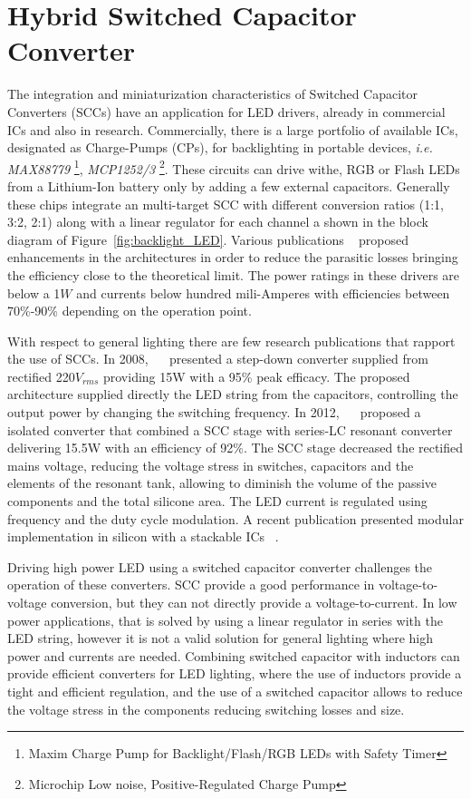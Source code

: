 \chapter{Hybrid Switched Capacitor Converter}

The integration and miniaturization characteristics of Switched Capacitor Converters (SCCs) have an application for LED drivers, already in  commercial ICs and also in research. Commercially, there is a large portfolio of available ICs, designated as Charge-Pumps (CPs), for backlighting in portable devices, \emph{i.e.}  \emph{MAX88779} \footnote{Maxim\textsuperscript{\textregistered} Charge Pump for Backlight/Flash/RGB LEDs with Safety Timer }, \emph{MCP1252/3} \footnote{Microchip\textsuperscript{\textregistered} Low noise, Positive-Regulated Charge Pump}. These circuits can drive withe, RGB or Flash LEDs from a Lithium-Ion battery only by adding a few external capacitors.  Generally these chips integrate an multi-target SCC with different conversion ratios (1:1, 3:2, 2:1) along with a linear regulator for each channel a shown in the block diagram of Figure~\ref{fig:backlight_LED}. Various publications ~\cite{07Feng,09Wu,10Yin} proposed enhancements in the architectures in order to reduce the parasitic losses bringing the efficiency close to the theoretical limit. The power ratings in these drivers are below a 1$W$ and currents below hundred mili-Amperes with efficiencies between 70\%-90\% depending on the operation point.

With respect to general lighting there are few research publications that rapport the use of SCCs. In 2008, ~\citeauthor{08Lee}~\cite{08Lee} presented a step-down converter supplied from rectified 220$V_{rms}$ providing 15W with a 95\% peak efficacy. The proposed architecture   supplied directly the LED string from the capacitors, controlling the output power by changing the switching frequency. In 2012, ~\citeauthor{2012Kline}~\cite{2012Kline} proposed a isolated converter that combined a SCC stage with series-LC resonant converter delivering 15.5W with an efficiency of  92\%.  The SCC stage decreased  the rectified mains voltage, reducing the voltage stress in switches, capacitors and the elements of the resonant tank, allowing to diminish  the volume of the passive components and the total silicone area. The LED current is regulated using frequency and the duty cycle modulation. A recent publication presented modular implementation in silicon with a stackable ICs ~\cite{2013Kline}.

Driving high power LED using a switched capacitor converter challenges the operation of these converters. SCC provide a good performance in voltage-to-voltage conversion, but they can not directly provide a voltage-to-current. In low power applications, that is solved by using a linear regulator in series with the LED string, however it is not a valid solution for general lighting where high power and currents are needed. Combining switched capacitor with inductors can provide efficient converters for LED lighting, where the use of inductors provide a tight and efficient regulation, and the use of a switched capacitor allows to reduce the voltage stress in the components reducing switching losses and size.

